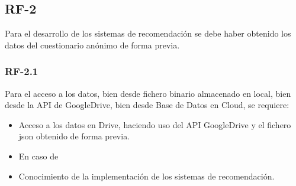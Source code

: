 \subsection{RF-2}
Para el desarrollo de los sistemas  de recomendación se debe haber obtenido los datos del cuestionario anónimo de forma previa. 
\subsubsection{RF-2.1}
Para el acceso a los datos, bien  desde fichero binario almacenado en local, bien desde la API de GoogleDrive, bien desde Base de Datos en Cloud, se requiere: 
\begin{itemize}
\item Acceso a los datos en Drive, haciendo uso del API GoogleDrive y el fichero json obtenido de forma previa. 
\item En caso de 
\item Conocimiento de la implementación de los sistemas de recomendación. 

\end{itemize}